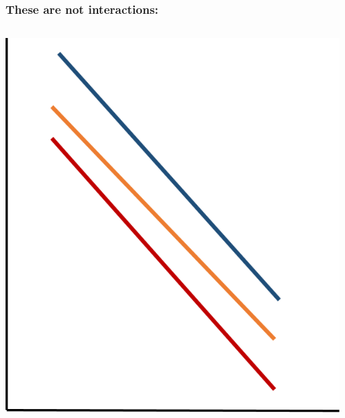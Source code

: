 \documentclass{beamer}
\begin{document}
\begin{frame}
    \frametitle{These are not interactions:}
    \begin{columns}
        \begin{column}{0.4\textwidth}
            \includegraphics[width=\textwidth]{lectures/day_3_LM_refresh_II/figures/no-inter-1.png}
        \end{column}
        \begin{column}{0.45\textwidth}

\end{column}
\end{columns}
\end{frame}
\end{document}
